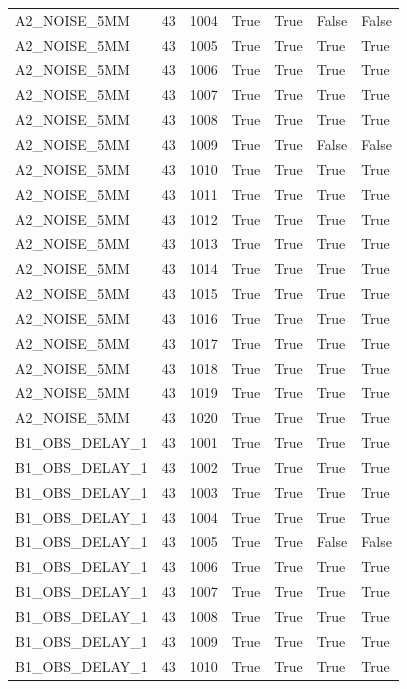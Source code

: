 \documentclass[11pt,a4paper,oneside]{book}
\begin{document}
\begin{longtable}{l l l l l l l}
A2\_NOISE\_5MM & 43 & 1004 & True & True & False & False \\
A2\_NOISE\_5MM & 43 & 1005 & True & True & True & True \\
A2\_NOISE\_5MM & 43 & 1006 & True & True & True & True \\
A2\_NOISE\_5MM & 43 & 1007 & True & True & True & True \\
A2\_NOISE\_5MM & 43 & 1008 & True & True & True & True \\
A2\_NOISE\_5MM & 43 & 1009 & True & True & False & False \\
A2\_NOISE\_5MM & 43 & 1010 & True & True & True & True \\
A2\_NOISE\_5MM & 43 & 1011 & True & True & True & True \\
A2\_NOISE\_5MM & 43 & 1012 & True & True & True & True \\
A2\_NOISE\_5MM & 43 & 1013 & True & True & True & True \\
A2\_NOISE\_5MM & 43 & 1014 & True & True & True & True \\
A2\_NOISE\_5MM & 43 & 1015 & True & True & True & True \\
A2\_NOISE\_5MM & 43 & 1016 & True & True & True & True \\
A2\_NOISE\_5MM & 43 & 1017 & True & True & True & True \\
A2\_NOISE\_5MM & 43 & 1018 & True & True & True & True \\
A2\_NOISE\_5MM & 43 & 1019 & True & True & True & True \\
A2\_NOISE\_5MM & 43 & 1020 & True & True & True & True \\
B1\_OBS\_DELAY\_1 & 43 & 1001 & True & True & True & True \\
B1\_OBS\_DELAY\_1 & 43 & 1002 & True & True & True & True \\
B1\_OBS\_DELAY\_1 & 43 & 1003 & True & True & True & True \\
B1\_OBS\_DELAY\_1 & 43 & 1004 & True & True & True & True \\
B1\_OBS\_DELAY\_1 & 43 & 1005 & True & True & False & False \\
B1\_OBS\_DELAY\_1 & 43 & 1006 & True & True & True & True \\
B1\_OBS\_DELAY\_1 & 43 & 1007 & True & True & True & True \\
B1\_OBS\_DELAY\_1 & 43 & 1008 & True & True & True & True \\
B1\_OBS\_DELAY\_1 & 43 & 1009 & True & True & True & True \\
B1\_OBS\_DELAY\_1 & 43 & 1010 & True & True & True & True \\

\end{longtable}
\end{document}
